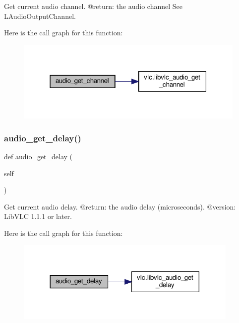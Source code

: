 \begin{DoxyVerb}Get current audio channel.
@return: the audio channel See L{AudioOutputChannel}.
\end{DoxyVerb}
 Here is the call graph for this function\+:
\nopagebreak
\begin{figure}[H]
\begin{center}
\leavevmode
\includegraphics[width=316pt]{classvlc_1_1_media_player_a9ba6b4faf2208b7bb1db2ad525a50ab0_cgraph}
\end{center}
\end{figure}
\mbox{\label{classvlc_1_1_media_player_a061b1fbe2a1ed302e0bd515b864acfe9}} 
\subsubsection{\texorpdfstring{audio\+\_\+get\+\_\+delay()}{audio\_get\_delay()}}
{\footnotesize\ttfamily def audio\+\_\+get\+\_\+delay (\begin{DoxyParamCaption}\item[{}]{self }\end{DoxyParamCaption})}

\begin{DoxyVerb}Get current audio delay.
@return: the audio delay (microseconds).
@version: LibVLC 1.1.1 or later.
\end{DoxyVerb}
 Here is the call graph for this function\+:
\nopagebreak
\begin{figure}[H]
\begin{center}
\leavevmode
\includegraphics[width=305pt]{classvlc_1_1_media_player_a061b1fbe2a1ed302e0bd515b864acfe9_cgraph}
\end{center}
\end{figure}
\mbox{\label{classvlc_1_1_media_player_a9baa0970647aed79716319f4f956013d}} 
